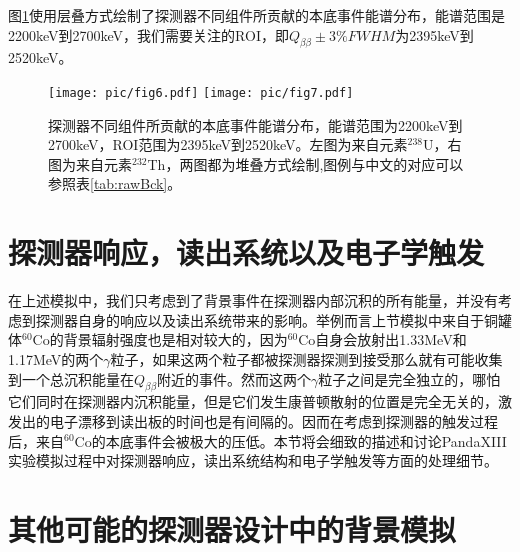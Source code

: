 图\ref{fig:stacked_spectrum}使用层叠方式绘制了探测器不同组件所贡献的本底事件能谱分布，能谱范围是2200keV到2700keV，我们需要关注的ROI，即$Q_{\beta\beta}\pm3\% FWHM$为2395keV到2520keV。

\begin{figure}[tbh]
    \centering
    \texttt{[image: pic/fig6.pdf]}
    \texttt{[image: pic/fig7.pdf]}
    \caption{探测器不同组件所贡献的本底事件能谱分布，能谱范围为2200keV到2700keV，ROI范围为2395keV到2520keV。左图为来自元素$^{238}$U，右图为来自元素$^{232}$Th，两图都为堆叠方式绘制,图例与中文的对应可以参照表\ref{tab:rawBck}。}
    \label{fig:stacked_spectrum}
\end{figure}

\section{探测器响应，读出系统以及电子学触发}

在上述模拟中，我们只考虑到了背景事件在探测器内部沉积的所有能量，并没有考虑到探测器自身的响应以及读出系统带来的影响。举例而言上节模拟中来自于铜罐体$^{60}$Co的背景辐射强度也是相对较大的，因为$^{60}$Co自身会放射出1.33MeV和1.17MeV的两个$\gamma$粒子，如果这两个粒子都被探测器探测到接受那么就有可能收集到一个总沉积能量在$Q_{\beta\beta}$附近的事件。然而这两个$\gamma$粒子之间是完全独立的，哪怕它们同时在探测器内沉积能量，但是它们发生康普顿散射的位置是完全无关的，激发出的电子漂移到读出板的时间也是有间隔的。因而在考虑到探测器的触发过程后，来自$^{60}$Co的本底事件会被极大的压低。本节将会细致的描述和讨论PandaXIII实验模拟过程中对探测器响应，读出系统结构和电子学触发等方面的处理细节。



\section{其他可能的探测器设计中的背景模拟}

